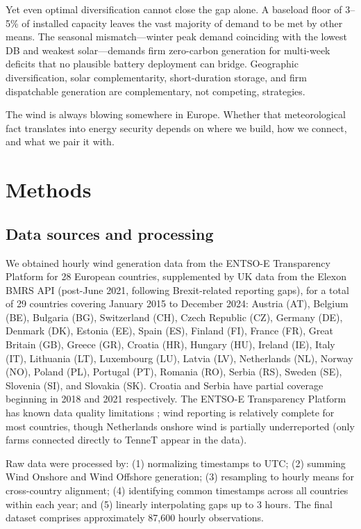 \documentclass[sn-nature]{sn-jnl}%
\begin{document}
Yet even optimal diversification cannot close the gap alone. A baseload floor of 3--5\% of installed capacity leaves the vast majority of demand to be met by other means. The seasonal mismatch---winter peak demand coinciding with the lowest DB and weakest solar---demands firm zero-carbon generation for multi-week deficits that no plausible battery deployment can bridge. Geographic diversification, solar complementarity, short-duration storage, and firm dispatchable generation are complementary, not competing, strategies.

The wind is always blowing somewhere in Europe. Whether that meteorological fact translates into energy security depends on where we build, how we connect, and what we pair it with.


\section{Methods}\label{sec:methods}

\subsection{Data sources and processing}

We obtained hourly wind generation data from the ENTSO-E Transparency Platform for 28 European countries, supplemented by UK data from the Elexon BMRS API (post-June 2021, following Brexit-related reporting gaps), for a total of 29 countries covering January 2015 to December 2024: Austria (AT), Belgium (BE), Bulgaria (BG), Switzerland (CH), Czech Republic (CZ), Germany (DE), Denmark (DK), Estonia (EE), Spain (ES), Finland (FI), France (FR), Great Britain (GB), Greece (GR), Croatia (HR), Hungary (HU), Ireland (IE), Italy (IT), Lithuania (LT), Luxembourg (LU), Latvia (LV), Netherlands (NL), Norway (NO), Poland (PL), Portugal (PT), Romania (RO), Serbia (RS), Sweden (SE), Slovenia (SI), and Slovakia (SK). Croatia and Serbia have partial coverage beginning in 2018 and 2021 respectively. The ENTSO-E Transparency Platform has known data quality limitations \cite{hirth2018}; wind reporting is relatively complete for most countries, though Netherlands onshore wind is partially underreported (only farms connected directly to TenneT appear in the data).

Raw data were processed by: (1) normalizing timestamps to UTC; (2) summing Wind Onshore and Wind Offshore generation; (3) resampling to hourly means for cross-country alignment; (4) identifying common timestamps across all countries within each year; and (5) linearly interpolating gaps up to 3 hours. The final dataset comprises approximately 87,600 hourly observations.
\end{document}
